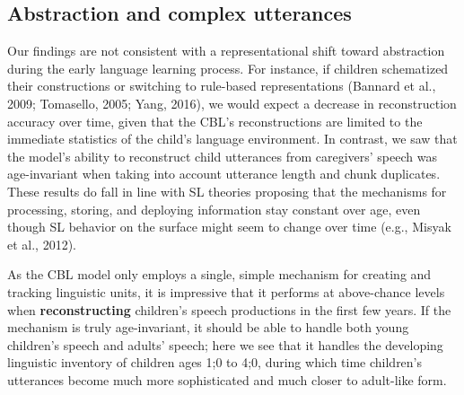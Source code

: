\documentclass[
  english,
  man,mask,floatsintext]{apa6}
\begin{document}
\hypertarget{abstraction-and-complex-utterances}{%
\subsection{Abstraction and complex utterances}\label{abstraction-and-complex-utterances}}

Our findings are not consistent with a representational shift toward abstraction during the early language learning process. For instance, if children schematized their constructions or switching to rule-based representations (Bannard et al., 2009; Tomasello, 2005; Yang, 2016), we would expect a decrease in reconstruction accuracy over time, given that the CBL's reconstructions are limited to the immediate statistics of the child's language environment. In contrast, we saw that the model's ability to reconstruct child utterances from caregivers' speech was age-invariant when taking into account utterance length and chunk duplicates. These results do fall in line with SL theories proposing that the mechanisms for processing, storing, and deploying information stay constant over age, even though SL behavior on the surface might seem to change over time (e.g., Misyak et al., 2012).

As the CBL model only employs a single, simple mechanism for creating and tracking linguistic units, it is impressive that it performs at above-chance levels when \textbf{reconstructing} children's speech productions in the first few years. If the mechanism is truly age-invariant, it should be able to handle both young children's speech and adults' speech; here we see that it handles the developing linguistic inventory of children ages 1;0 to 4;0, during which time children's utterances become much more sophisticated and much closer to adult-like form.
\end{document}
